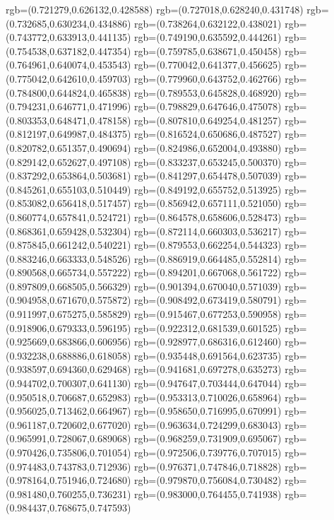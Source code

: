 {{{			rgb=(0.721279,0.626132,0.428588)
			rgb=(0.727018,0.628240,0.431748)
			rgb=(0.732685,0.630234,0.434886)
			rgb=(0.738264,0.632122,0.438021)
			rgb=(0.743772,0.633913,0.441135)
			rgb=(0.749190,0.635592,0.444261)
			rgb=(0.754538,0.637182,0.447354)
			rgb=(0.759785,0.638671,0.450458)
			rgb=(0.764961,0.640074,0.453543)
			rgb=(0.770042,0.641377,0.456625)
			rgb=(0.775042,0.642610,0.459703)
			rgb=(0.779960,0.643752,0.462766)
			rgb=(0.784800,0.644824,0.465838)
			rgb=(0.789553,0.645828,0.468920)
			rgb=(0.794231,0.646771,0.471996)
			rgb=(0.798829,0.647646,0.475078)
			rgb=(0.803353,0.648471,0.478158)
			rgb=(0.807810,0.649254,0.481257)
			rgb=(0.812197,0.649987,0.484375)
			rgb=(0.816524,0.650686,0.487527)
			rgb=(0.820782,0.651357,0.490694)
			rgb=(0.824986,0.652004,0.493880)
			rgb=(0.829142,0.652627,0.497108)
			rgb=(0.833237,0.653245,0.500370)
			rgb=(0.837292,0.653864,0.503681)
			rgb=(0.841297,0.654478,0.507039)
			rgb=(0.845261,0.655103,0.510449)
			rgb=(0.849192,0.655752,0.513925)
			rgb=(0.853082,0.656418,0.517457)
			rgb=(0.856942,0.657111,0.521050)
			rgb=(0.860774,0.657841,0.524721)
			rgb=(0.864578,0.658606,0.528473)
			rgb=(0.868361,0.659428,0.532304)
			rgb=(0.872114,0.660303,0.536217)
			rgb=(0.875845,0.661242,0.540221)
			rgb=(0.879553,0.662254,0.544323)
			rgb=(0.883246,0.663333,0.548526)
			rgb=(0.886919,0.664485,0.552814)
			rgb=(0.890568,0.665734,0.557222)
			rgb=(0.894201,0.667068,0.561722)
			rgb=(0.897809,0.668505,0.566329)
			rgb=(0.901394,0.670040,0.571039)
			rgb=(0.904958,0.671670,0.575872)
			rgb=(0.908492,0.673419,0.580791)
			rgb=(0.911997,0.675275,0.585829)
			rgb=(0.915467,0.677253,0.590958)
			rgb=(0.918906,0.679333,0.596195)
			rgb=(0.922312,0.681539,0.601525)
			rgb=(0.925669,0.683866,0.606956)
			rgb=(0.928977,0.686316,0.612460)
			rgb=(0.932238,0.688886,0.618058)
			rgb=(0.935448,0.691564,0.623735)
			rgb=(0.938597,0.694360,0.629468)
			rgb=(0.941681,0.697278,0.635273)
			rgb=(0.944702,0.700307,0.641130)
			rgb=(0.947647,0.703444,0.647044)
			rgb=(0.950518,0.706687,0.652983)
			rgb=(0.953313,0.710026,0.658964)
			rgb=(0.956025,0.713462,0.664967)
			rgb=(0.958650,0.716995,0.670991)
			rgb=(0.961187,0.720602,0.677020)
			rgb=(0.963634,0.724299,0.683043)
			rgb=(0.965991,0.728067,0.689068)
			rgb=(0.968259,0.731909,0.695067)
			rgb=(0.970426,0.735806,0.701054)
			rgb=(0.972506,0.739776,0.707015)
			rgb=(0.974483,0.743783,0.712936)
			rgb=(0.976371,0.747846,0.718828)
			rgb=(0.978164,0.751946,0.724680)
			rgb=(0.979870,0.756084,0.730482)
			rgb=(0.981480,0.760255,0.736231)
			rgb=(0.983000,0.764455,0.741938)
			rgb=(0.984437,0.768675,0.747593)
}}}
